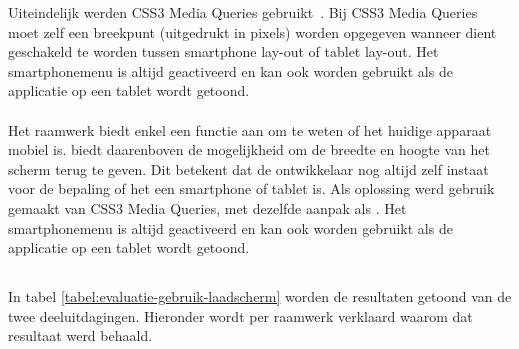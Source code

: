 Uiteindelijk werden CSS3 Media Queries gebruikt~\cite{Hadlock2012,JQuery2013e}. 
Bij CSS3 Media Queries moet zelf een breekpunt (uitgedrukt in pixels) worden opgegeven wanneer dient geschakeld te worden tussen smartphone lay-out of tablet lay-out.
Het smartphonemenu is altijd geactiveerd en kan ook worden gebruikt als de applicatie op een tablet wordt getoond.

\paragraph{\lungo}
Het raamwerk biedt enkel een functie aan om te weten of het huidige apparaat mobiel is.
\quo{} biedt daarenboven de mogelijkheid om de breedte en hoogte van het scherm terug te geven.
Dit betekent dat de ontwikkelaar nog altijd zelf instaat voor de bepaling of het een smartphone of tablet is.
Als oplossing werd gebruik gemaakt van CSS3 Media Queries, met dezelfde aanpak als \jqm{}.
Het smartphonemenu is altijd geactiveerd en kan ook worden gebruikt als de applicatie op een tablet wordt getoond.


\subsection{} 
\label{sec:evaluatie-gebruik-laadscherm}

In tabel \ref{tabel:evaluatie-gebruik-laadscherm} worden de resultaten getoond van de twee deeluitdagingen.
Hieronder wordt per raamwerk verklaard waarom dat resultaat werd behaald.

\begin{table}
\centering
{}
\caption{Gebruik van .}
\label{tabel:evaluatie-gebruik-laadscherm}
\end{table}

